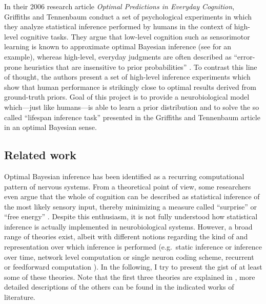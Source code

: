 \documentclass[a4paper,11pt]{article}
\begin{document}
In their 2006 research article \emph{Optimal Predictions in Everyday Cognition}, Griffiths and Tennenbaum conduct a set of psychological experiments in which they analyze statistical inference performed by humans in the context of high-level cognitive tasks. They argue that low-level cognition such as sensorimotor learning is known to approximate optimal Bayesian inference (see \cite{kording2004bayesian} for an example), whereas high-level, everyday judgments are often described as \enquote{error-prone heuristics that are insensitive to prior probabilities} \cite{griffiths2006optimal}. To contrast this line of thought, the authors present a set of high-level inference experiments which show that human performance is strikingly close to optimal results derived from ground-truth priors. Goal of this project is to provide a neurobiological model which---just like humans---is able to learn a prior distribution and to solve the so called \enquote{lifespan inference task} presented in the Griffiths and Tennenbaum article in an optimal Bayesian sense.

\subsection{Related work}

Optimal Bayesian inference has been identified as a recurring computational pattern of nervous systems. From a theoretical point of view, some researchers even argue that the whole of cognition can be described as statistical inference of the most likely sensory input, thereby minimizing a measure called \enquote{surprise} or \enquote{free energy} \cite{friston2010free}. Despite this enthusiasm, it is not fully understood how statistical inference is actually implemented in  neurobiological systems. However, a broad range of theories exist, albeit with different notions regarding the kind of and representation over which inference is performed (e.g.~static inference or inference over time, network level computation or single neuron coding scheme, recurrent or feedforward computation \textellipsis). In the following, I try to present the gist of at least some of these theories. Note that the first three theories are explained in \cite{knill2004bayesian}, more detailed descriptions of the others can be found in the indicated works of literature.
\end{document}
